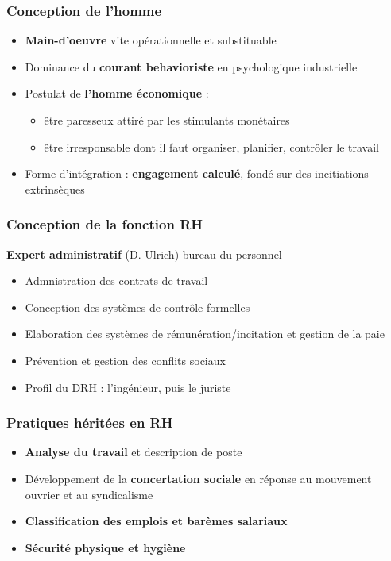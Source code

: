 \documentclass[12pt]{beamer}
\begin{document}
  \begin{frame}
    \frametitle{Conception de l'homme}
    
    \begin{itemize}
     \item \textbf{Main-d'oeuvre} vite opérationnelle et substituable
     \item Dominance du \textbf{courant behavioriste} en psychologique industrielle
     \item Postulat de \textbf{l'homme économique} :
	\begin{itemize}
	 \item être paresseux attiré par les stimulants monétaires
	 \item être irresponsable dont il faut organiser, planifier, contrôler le travail
	\end{itemize}
    \item Forme d'intégration : \textbf{engagement calculé}, fondé sur des incitiations extrinsèques
    \end{itemize}
  \end{frame}
  
  \begin{frame}
    \frametitle{Conception de la fonction RH}
    
    \textbf{Expert administratif} (D. Ulrich) \og{} bureau du personnel \fg{}
    
    \begin{itemize}
     \item Admnistration des contrats de travail
     \item Conception des systèmes de contrôle formelles
     \item Elaboration des systèmes de rémunération/incitation et gestion de la paie
     \item Prévention et gestion des conflits sociaux
     \item Profil du \og{} DRH \fg{} : l'ingénieur, puis le juriste
    \end{itemize}
  \end{frame}
  
  \begin{frame}
    \frametitle{Pratiques héritées en RH}
    
    \begin{itemize}
     \item \textbf{Analyse du travail} et description de poste
     \item Développement de la \textbf{concertation sociale} en réponse au mouvement ouvrier et au syndicalisme
     \item \textbf{Classification des emplois et barèmes salariaux}
     \item \textbf{Sécurité physique et hygiène}
    \end{itemize}
  \end{frame}
  
\end{document}
